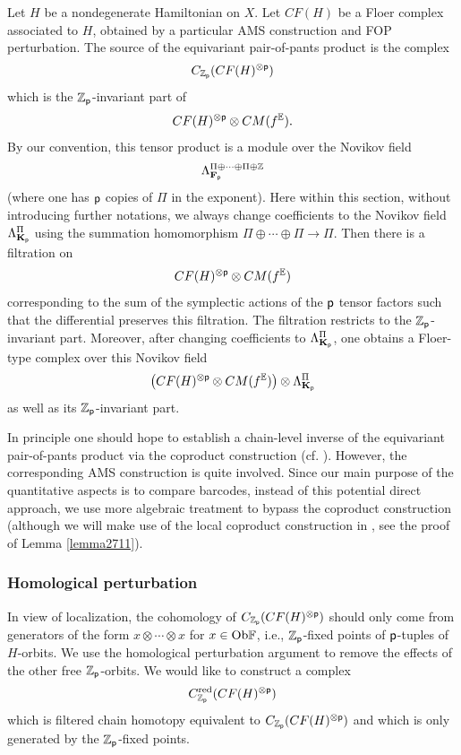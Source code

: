 \documentclass[reqno, 10pt]{amsart}
\numberwithin{equation}{section}
\numberwithin{equation}{section}
\theoremstyle{definition}
\theoremstyle{remark}
\newcommand{\beqn}{\begin{equation*}}
\newcommand{\eeqn}{\end{equation*}}
\newcommand{\mb}{\mathbb}
\newcommand{\p}{{\sf p}}
\newcommand{\fp}{{\bf F}_{\sf p}}
\newcommand{\kp}{{\bf K}_{\sf p}}
\newcommand{\zp}{{{\mb Z}_{\sf p}}}
\newcommand{\ep}{{{\mathbb E}}}
\begin{document}
Let $H$ be a nondegenerate Hamiltonian on $X$. Let $CF(H)$ be a Floer complex associated to $H$, obtained by a particular AMS construction and FOP perturbation. The source of the equivariant pair-of-pants product is the complex
\beqn
C_{\zp}(CF(H)^{\otimes \p})
\eeqn
which is the $\zp$-invariant part of 
\beqn
CF(H)^{\otimes \p} \otimes CM(f^\ep).
\eeqn
By our convention, this tensor product is a module over the Novikov field
\beqn
\Lambda_{\fp}^{\Pi\oplus \cdots \oplus \Pi \oplus {\mb Z}}
\eeqn
(where one has $\p$ copies of $\Pi$ in the exponent). Here within this section, without introducing further notations, we always change coefficients to the Novikov field $\Lambda_{\kp}^\Pi$ using the summation homomorphism $\Pi\oplus \cdots \oplus \Pi \to \Pi$. Then there is a filtration on 
\beqn
CF(H)^{\otimes \p} \otimes CM(f^\ep)
\eeqn
corresponding to the sum of the symplectic actions of the $\p$ tensor factors such that the differential preserves this filtration. The filtration restricts to the $\zp$-invariant part. Moreover, after changing coefficients to $\Lambda_{\kp}^{\Pi}$, one obtains a Floer-type complex over this Novikov field
\beqn
\left( CF(H)^{\otimes \p} \otimes CM(f^\ep) \right) \otimes \Lambda_{\kp}^{\Pi}
\eeqn
as well as its $\zp$-invariant part. 

In principle one should hope to establish a chain-level inverse of the equivariant pair-of-pants product via the coproduct construction (cf. \cite{shelukhin-zhao}). However, the corresponding AMS construction is quite involved. Since our main purpose of the quantitative aspects is to compare barcodes, instead of this potential direct approach, we use more algebraic treatment to bypass the coproduct construction (although we will make use of the local coproduct construction in \cite{shelukhin-zhao}, see the proof of Lemma \ref{lemma2711}). 

\subsubsection{Homological perturbation}

In view of localization, the cohomology of $C_{\zp}(CF(H)^{\otimes \p})$ should only come from generators of the form $x \otimes \cdots \otimes x$ for $x \in {\rm Ob}{\mb F}$, i.e., $\zp$-fixed points of $\p$-tuples of $H$-orbits. We use the homological perturbation argument to remove the effects of the other free $\zp$-orbits. We would like to construct a complex
\beqn
C_{\zp}^{\rm red}(CF(H)^{\otimes \p})
\eeqn
which is filtered chain homotopy equivalent to $C_{\zp}(CF(H)^{\otimes \p})$ and which is only generated by the $\zp$-fixed points.
\end{document}
